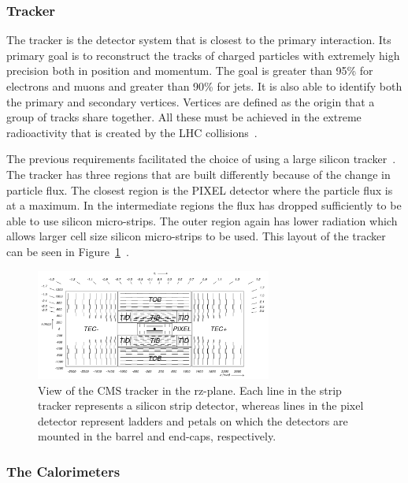 \subsubsection{Tracker}
The tracker is the detector system that is closest to the primary interaction.  Its primary goal is to reconstruct the tracks of charged particles with extremely high precision both in position and momentum. The goal is greater than 95\% for electrons and muons and greater than 90\% for jets. It is also able to identify both the primary and secondary vertices.  Vertices are defined as the origin that a group of tracks share together. All these must be achieved in the extreme radioactivity that is created by the LHC collisions~\cite{cms_trakcer_project}.

The previous requirements facilitated the choice of using a large silicon tracker~\cite{cms_trakcer_project}.  The tracker has three regions that are built differently because of the change in particle flux.  The closest region is the PIXEL detector where the particle flux is at a maximum.
In the intermediate regions the flux has dropped sufficiently to be able to use silicon micro-strips.  The outer region again has lower radiation which allows larger cell size silicon micro-strips to be used.  This layout of the tracker can be seen in Figure~\ref{fig:CMS_tacker}~\cite{2010JInst...5.6007S}.

\begin{figure}[htb]
\centering
\includegraphics[width=0.69\textwidth]{Experiment/fig_cmstracker.png}
\caption{View of the CMS tracker in the rz-plane. Each line in the strip tracker represents a silicon strip detector, whereas lines in the pixel detector represent ladders and petals on which the detectors are mounted in the barrel and end-caps, respectively.~\cite{2010JInst...5.6007S}}
\label{fig:CMS_tacker}
\end{figure}

\subsubsection{The Calorimeters}

